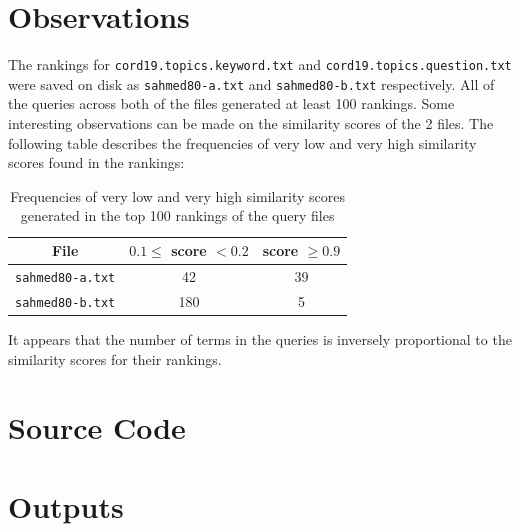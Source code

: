 \documentclass[11pt]{article}
\begin{document}
\section{Observations}
The rankings for \texttt{cord19.topics.keyword.txt} and \texttt{cord19.topics.question.txt} were saved on disk as \texttt{sahmed80-a.txt} and \texttt{sahmed80-b.txt} respectively. All of the queries across both of the files generated at least 100 rankings. Some interesting observations can be made on the similarity scores of the 2 files. The following table describes the frequencies of very low and very high similarity scores found in the rankings:

\begin{table}[!ht]
    \caption{Frequencies of very low and very high similarity scores generated in the top 100 rankings of the query files}
    \begin{center}

        \begin{tabular}{| c | c | c |}
        \hline
        \textbf{File} & \textbf{$0.1 \leq$ score $< 0.2$} & \textbf{score $\geq 0.9$}
        \\ \hline
        \texttt{sahmed80-a.txt} & 42 & 39
        \\ \hline
        \texttt{sahmed80-b.txt} & 180 & 5
        \\ \hline
        \end{tabular}

    \end{center}

\end{table}

It appears that the number of terms in the queries is inversely proportional to the similarity scores for their rankings.

\newpage
\clearpage

\appendix
{}%

\section{Source Code} \label{appendix:src}



\section{Outputs} \label{appendix:outputs}


\end{document}

